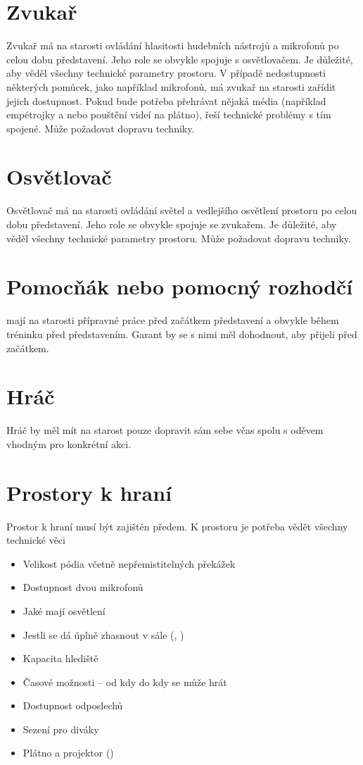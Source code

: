 \section{Zvukař} Zvukař má na starosti ovládání hlasitosti hudebních nástrojů a mikrofonů po celou dobu představení. Jeho role se obvykle spojuje s osvětlovačem. Je důležité, aby věděl všechny technické parametry prostoru. 
V případě nedostupnosti některých pomůcek, jako například mikrofonů, má zvukař na starosti zařídit jejich dostupnost. 
Pokud bude potřeba přehrávat nějaká média (například empétrojky a nebo pouštění videí na plátno), řeší technické problémy s tím spojené. 
Může požadovat dopravu techniky. 
\section{Osvětlovač} Osvětlovač má na starosti ovládání světel a vedlejšího osvětlení prostoru po celou dobu představení. Jeho role se obvykle spojuje se zvukařem. Je důležité, aby věděl všechny technické parametry prostoru. 
Může požadovat dopravu techniky. 
\section{Pomocňák nebo pomocný rozhodčí}   mají na starosti přípravné práce před začátkem představení a obvykle během tréninku před představením. Garant by se s nimi měl dohodnout, aby přijeli před začátkem. 
\section{Hráč} Hráč by měl mít na starost pouze dopravit sám sebe včas spolu s oděvem vhodným pro konkrétní akci. 
\section{Prostory k hraní} Prostor k hraní musí být zajištěn předem. K prostoru je potřeba vědět všechny technické věci 
\begin{itemize}
\item Velikost pódia včetně nepřemistitelných překážek
\item Dostupnost dvou mikrofonů
\item Jaké mají osvětlení
\item Jestli se dá úplně zhasnout v sále (, )
\item Kapacita hlediště
\item Časové možnosti – od kdy do kdy se může hrát
\item Dostupnost odposlechů
\item Sezení pro diváky
\item Plátno a projektor ()
\end{itemize}
 
